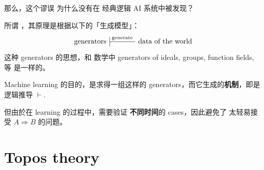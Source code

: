那么，这个谬误 为什么没有在 经典逻辑 AI 系统中被发现？

所谓 ，其原理是根据以下的「生成模型」： 
\begin{equation}
\begin{tikzcd}[| /.tip = {Bar[scale=3]}, column sep = large]
\mbox{generators} \arrow[|-,r, "\mathrm{generate}"]
& \mbox{data of the world}
\end{tikzcd}
\end{equation}
这种 generators 的思想，和 数学中 generators of ideals, groups, function fields, 等 是一样的。 

Machine learning 的目的，是求得一组这样的 generators，而它生成的\textbf{机制}，即是逻辑推导 $\vdash$.

但由於在 learning 的过程中，需要验证 \textbf{不同时间}的 cases，因此避免了 太轻易接受 $A \Rightarrow B$ 的问题。 

\section{Topos theory}

